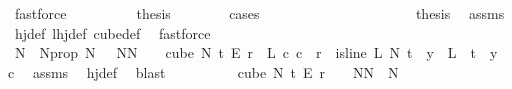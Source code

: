 \begin{isabellebody}
\ fastforce\isanewline
\ \ \ \ \ \ \isamarkupfalse%
\ \isamarkupfalse%
\ {\isacharquery}{\kern0pt}thesis\isanewline
\ \ \ \ \ \ \isamarkupfalse%
\ cases\isanewline
\ \ \ \ \ \ \ \ \isamarkupfalse%
\ {}\isanewline
\ \ \ \ \ \ \ \ \isamarkupfalse%
\ \isamarkupfalse%
\ {\isacharquery}{\kern0pt}thesis\ \isamarkupfalse%
\ assms\ \isamarkupfalse%
\ hj{\isacharunderscore}{\kern0pt}def\ lhj{\isacharunderscore}{\kern0pt}def\ cube{\isacharunderscore}{\kern0pt}def\ \isamarkupfalse%
\ fastforce\isanewline
\ \ \ \ \ \ \isamarkupfalse%
\isanewline
\ \ \ \ \ \ \ \ \isamarkupfalse%
\ {}\isanewline
\ \ \ \ \ \ \ \ \isamarkupfalse%
\ \isamarkupfalse%
\ N\ \ N{\isacharunderscore}{\kern0pt}prop{\isacharcolon}{\kern0pt}\ {\isachardoublequoteopen}N\ {\isachargreater}{\kern0pt}\ {}{\isachardoublequoteclose}\ {\isachardoublequoteopen}{\isacharparenleft}{\kern0pt}{\isasymforall}N{\isacharprime}{\kern0pt}{\isasymge}N{\isachardot}{\kern0pt}\ {\isasymforall}{\isasymchi}{\isachardot}{\kern0pt}\ {\isasymchi}\ {\isasymin}\ cube\ N{\isacharprime}{\kern0pt}\ t\ {\isasymrightarrow}\isactrlsub E\ {\isacharbraceleft}{\kern0pt}{\isachardot}{\kern0pt}{\isachardot}{\kern0pt}{\isacharless}{\kern0pt}r{\isacharbraceright}{\kern0pt}\ {\isasymlongrightarrow}\ {\isacharparenleft}{\kern0pt}{\isasymexists}L\ c{\isachardot}{\kern0pt}\ c\ {\isacharless}{\kern0pt}\ r\ {\isasymand}\ is{\isacharunderscore}{\kern0pt}line\ L\ N{\isacharprime}{\kern0pt}\ t\ {\isasymand}\ {\isacharparenleft}{\kern0pt}{\isasymforall}y\ {\isasymin}\ L\ {\isacharbackquote}{\kern0pt}\ {\isacharbraceleft}{\kern0pt}{\isachardot}{\kern0pt}{\isachardot}{\kern0pt}{\isacharless}{\kern0pt}t{\isacharbraceright}{\kern0pt}{\isachardot}{\kern0pt}\ {\isasymchi}\ y\ {\isacharequal}{\kern0pt}\ c{\isacharparenright}{\kern0pt}{\isacharparenright}{\kern0pt}{\isacharparenright}{\kern0pt}{\isachardoublequoteclose}\ \isamarkupfalse%
\ assms\ \isamarkupfalse%
\ hj{\isacharunderscore}{\kern0pt}def\ \isamarkupfalse%
\ blast\isanewline
\ \ \ \ \ \ \ \ \isamarkupfalse%
\ {\isachardoublequoteopen}cube\ N{\isacharprime}{\kern0pt}\ t\ {\isasymrightarrow}\isactrlsub E\ {\isacharbraceleft}{\kern0pt}{\isachardot}{\kern0pt}{\isachardot}{\kern0pt}{\isacharless}{\kern0pt}r{\isacharbraceright}{\kern0pt}\ {\isacharequal}{\kern0pt}\ {\isacharbraceleft}{\kern0pt}{\isacharbraceright}{\kern0pt}{\isachardoublequoteclose}\ \ {\isachardoublequoteopen}N{\isacharprime}{\kern0pt}{\isasymge}N{\isachardoublequoteclose}\ \ N{\isacharprime}{\kern0pt}\isanewline

\end{isabellebody}
